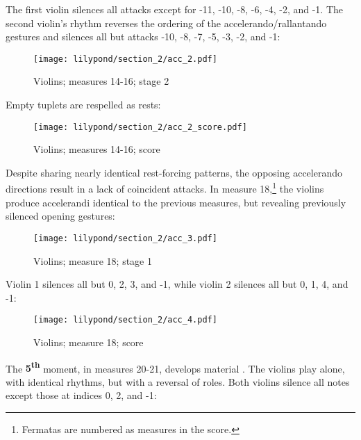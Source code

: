 The first violin silences all attacks except for -11, -10, -8, -6, -4, -2, and -1. The second violin's rhythm reverses the ordering of the accelerando/rallantando gestures and silences all but attacks -10, -8, -7, -5, -3, -2, and -1:

\setcounter{figure}{13}
\setcounter{subFigure}{2}
\begin{figure}[H]
    \texttt{[image: lilypond/section\_2/acc\_2.pdf]}
    \caption{Violins; measures 14-16; stage 2}
    \label{fig:accelerando-2}
\end{figure}

Empty tuplets are respelled as rests:

\setcounter{figure}{13}
\setcounter{subFigure}{3}
\begin{figure}[H]
    \texttt{[image: lilypond/section\_2/acc\_2\_score.pdf]}
    \caption{Violins; measures 14-16; score}
    \label{fig:accelerando-2-score}
\end{figure}

Despite sharing nearly identical rest-forcing patterns, the opposing accelerando directions result in a lack of coincident attacks. In measure 18,\footnote{Fermatas are numbered as measures in the score.} the violins produce accelerandi identical to the previous measures, but revealing previously silenced opening gestures:

\setcounter{figure}{14}
\setcounter{subFigure}{1}
\begin{figure}[H]
    \texttt{[image: lilypond/section\_2/acc\_3.pdf]}
    \caption{Violins; measure 18; stage 1}
    \label{fig:accelerando-3}
\end{figure}

Violin 1 silences all but 0, 2, 3, and -1, while violin 2 silences all but 0, 1, 4, and -1:

\setcounter{figure}{14}
\setcounter{subFigure}{2}
\renewcommand{\thefigure}{\thechapter.\arabic{figure}.\alph{subFigure}}
\begin{figure}[H]
    \texttt{[image: lilypond/section\_2/acc\_4.pdf]}
    \caption{Violins; measure 18; score}
    \label{fig:accelerando-4}
\end{figure}

The \textbf{5\textsuperscript{th}} moment, in measures 20-21, develops material . The violins play alone, with identical rhythms, but with a reversal of roles. Both violins silence all notes except those at indices 0, 2, and -1:

